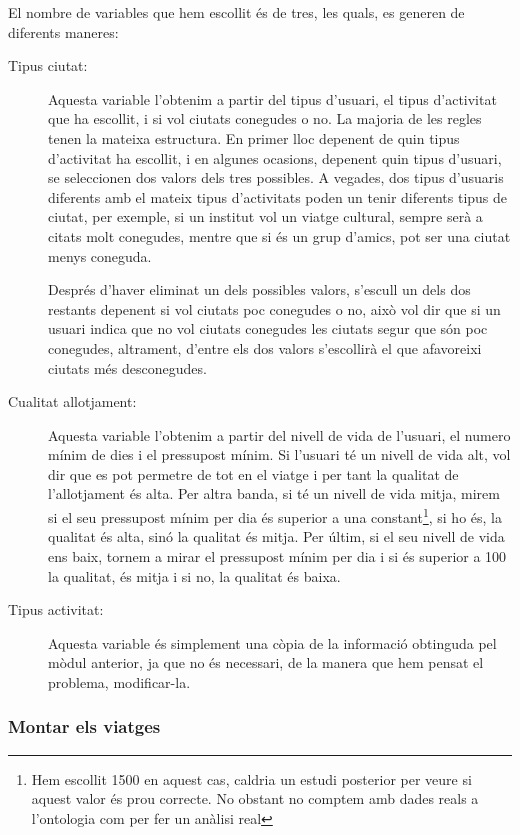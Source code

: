 \documentclass[11pt,a4paper]{article}
\begin{document}
El nombre de variables que hem escollit és de tres, les quals, es generen de diferents maneres:

\begin{description}
\item[Tipus ciutat:]Aquesta variable l'obtenim a partir del tipus d'usuari, el tipus d'activitat que ha escollit, i si vol ciutats conegudes o no. La majoria de les regles tenen la mateixa estructura. En primer lloc depenent de quin tipus d'activitat ha escollit, i en algunes ocasions, depenent quin tipus d'usuari, se seleccionen dos valors dels tres possibles. A vegades, dos tipus d'usuaris diferents amb el mateix tipus d'activitats poden un tenir diferents tipus de ciutat, per exemple, si un institut vol un viatge cultural, sempre serà a citats molt conegudes, mentre que si és un grup d'amics, pot ser una ciutat menys coneguda.

Després d'haver eliminat un dels possibles valors, s'escull un dels dos restants depenent si vol ciutats poc conegudes o no, això vol dir que si un usuari indica que no vol ciutats conegudes les ciutats segur que són poc conegudes, altrament, d'entre els dos valors s'escollirà el que afavoreixi ciutats més desconegudes.

\item[Cualitat allotjament:]Aquesta variable l'obtenim a partir del nivell de vida de l'usuari, el numero mínim de dies i el pressupost mínim. Si l'usuari té un nivell de vida alt, vol dir que es pot permetre de tot en el viatge i per tant la qualitat de l'allotjament és alta. Per altra banda, si té un nivell de vida mitja, mirem si el seu pressupost mínim per dia és superior a una constant\footnote{Hem escollit 1500 en aquest cas, caldria un estudi posterior per veure si aquest valor és prou correcte. No obstant no comptem amb dades reals a l'ontologia com per fer un anàlisi real}, si ho és, la qualitat és alta, sinó la qualitat és mitja. Per últim, si el seu nivell de vida ens baix, tornem a mirar el pressupost mínim per dia i si és superior a 100 la qualitat, és mitja i si no, la qualitat és baixa.

\item[Tipus activitat:] Aquesta variable és simplement una còpia de la informació obtinguda pel mòdul anterior, ja que no és necessari, de la manera que hem pensat el problema, modificar-la.
\end{description}


\subsubsection*{Montar els viatges}
\end{document}
